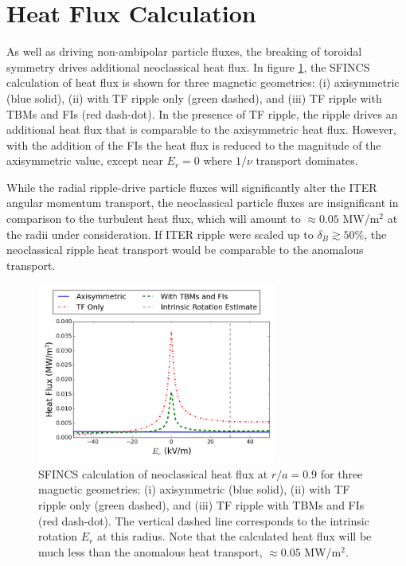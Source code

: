 \documentclass{article}
\begin{document}
\FloatBarrier

\section{Heat Flux Calculation}\label{heatflux}

As well as driving non-ambipolar particle fluxes, the breaking of toroidal symmetry drives additional neoclassical heat flux. In figure \ref{fig:HeatFlux}, the SFINCS calculation of heat flux is shown for three magnetic geometries: (i) axisymmetric (blue solid), (ii) with TF ripple only (green dashed), and (iii) TF ripple with TBMs and FIs (red dash-dot). In the presence of TF ripple, the ripple drives an additional heat flux that is comparable to the axisymmetric heat flux. However, with the addition of the FIs the heat flux is reduced to the magnitude of the axisymmetric value, except near $E_r = 0$ where $1/\nu$ transport dominates. 

While the radial ripple-drive particle fluxes will significantly alter the ITER angular momentum transport, the neoclassical particle fluxes are insignificant in comparison to the turbulent heat flux, which will amount to $\approx 0.05$ MW/m$^2$ at the radii under consideration. If ITER ripple were scaled up to $\delta_B \gtrsim 50\%$, the neoclassical ripple heat transport would be comparable to the anomalous transport.

\begin{figure}[h!]
\centering
\includegraphics[width=0.7\textwidth]
{HeatFlux.png}
\caption{\label{fig:HeatFlux} SFINCS calculation of neoclassical heat flux at $r/a = 0.9$ for three magnetic geometries: (i) axisymmetric (blue solid), (ii) with TF ripple only (green dashed), and (iii) TF ripple with TBMs and FIs (red dash-dot). The vertical dashed line corresponds to the intrinsic rotation $E_r$ at this radius. Note that the calculated heat flux will be much less than the anomalous heat transport, $\approx 0.05$ MW/m$^2$. }
\end{figure}
\end{document}
